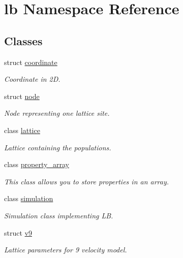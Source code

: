 \hypertarget{namespacelb}{\section{lb \-Namespace \-Reference}
\label{namespacelb}
}
\subsection*{\-Classes}
\begin{DoxyCompactItemize}
\item 
struct \hyperlink{structlb_1_1coordinate}{coordinate}
\begin{DoxyCompactList}\small\item\em \-Coordinate in 2\-D. \end{DoxyCompactList}\item 
struct \hyperlink{structlb_1_1node}{node}
\begin{DoxyCompactList}\small\item\em \-Node representing one lattice site. \end{DoxyCompactList}\item 
class \hyperlink{classlb_1_1lattice}{lattice}
\begin{DoxyCompactList}\small\item\em \-Lattice containing the populations. \end{DoxyCompactList}\item 
class \hyperlink{classlb_1_1property__array}{property\-\_\-array}
\begin{DoxyCompactList}\small\item\em \-This class allows you to store properties in an array. \end{DoxyCompactList}\item 
class \hyperlink{classlb_1_1simulation}{simulation}
\begin{DoxyCompactList}\small\item\em \-Simulation class implementing \-L\-B. \end{DoxyCompactList}\item 
struct \hyperlink{structlb_1_1v9}{v9}
\begin{DoxyCompactList}\small\item\em \-Lattice parameters for 9 velocity model. \end{DoxyCompactList}\end{DoxyCompactItemize}

